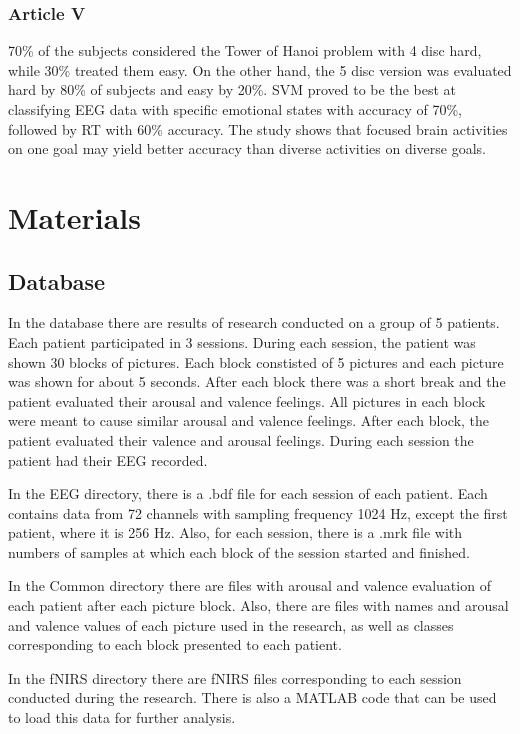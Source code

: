 \documentclass[10pt,journal,compsoc]{IEEEtran}
\begin{document}
\subsubsection*{Article V}
70\% of the subjects considered the Tower of Hanoi problem with 4 disc hard, while 30\% treated them easy. On the other hand, the 5 disc version was evaluated hard by 80\% of subjects and easy by 20\%. SVM proved to be the best at classifying EEG data with specific emotional states with accuracy of 70\%, followed by RT with 60\% accuracy. The study shows that focused brain activities on one goal may yield better accuracy than diverse activities on diverse goals.

\section{Materials}

\subsection{Database}
In the database there are results of research conducted on a group of 5 patients. Each patient participated in 3 sessions. During each session, the patient was shown 30 blocks of pictures. Each block constisted of 5 pictures and each picture was shown for about 5 seconds. After each block there was a short break and the patient evaluated their arousal and valence feelings. All pictures in each block were meant to cause similar arousal and valence feelings. After each block, the patient evaluated their valence and arousal feelings. During each session the patient had their EEG recorded.

In the EEG directory, there is a .bdf file for each session of each patient. Each contains data from 72 channels with sampling frequency 1024 Hz, except the first patient, where it is 256 Hz. Also, for each session, there is a .mrk file with numbers of samples at which each block of the session started and finished.

In the Common directory there are files with arousal and valence evaluation of each patient after each picture block. Also, there are files with names and arousal and valence values of each picture used in the research, as well as classes corresponding to each block presented to each patient.

In the fNIRS directory there are fNIRS files corresponding to each session conducted during the research. There is also a MATLAB code that can be used to load this data for further analysis.
\end{document}
